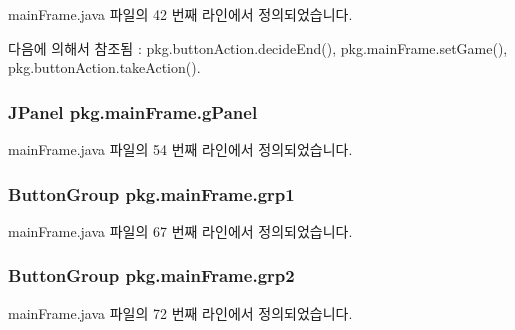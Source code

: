 main\+Frame.\+java 파일의 42 번째 라인에서 정의되었습니다.



다음에 의해서 참조됨 \+:  pkg.\+button\+Action.\+decide\+End(), pkg.\+main\+Frame.\+set\+Game(), pkg.\+button\+Action.\+take\+Action().

\subsubsection[{\texorpdfstring{g\+Panel}{gPanel}}]{\setlength{\rightskip}{0pt plus 5cm}J\+Panel pkg.\+main\+Frame.\+g\+Panel\hspace{0.3cm}{\ttfamily [private]}}\hypertarget{classpkg_1_1main_frame_a17ea45ba089445a24b9da9bf561f6603}{}\label{classpkg_1_1main_frame_a17ea45ba089445a24b9da9bf561f6603}


main\+Frame.\+java 파일의 54 번째 라인에서 정의되었습니다.

\subsubsection[{\texorpdfstring{grp1}{grp1}}]{\setlength{\rightskip}{0pt plus 5cm}Button\+Group pkg.\+main\+Frame.\+grp1\hspace{0.3cm}{\ttfamily [private]}}\hypertarget{classpkg_1_1main_frame_a5411fefa1bd3ef463e0823c2e0f7d528}{}\label{classpkg_1_1main_frame_a5411fefa1bd3ef463e0823c2e0f7d528}


main\+Frame.\+java 파일의 67 번째 라인에서 정의되었습니다.

\subsubsection[{\texorpdfstring{grp2}{grp2}}]{\setlength{\rightskip}{0pt plus 5cm}Button\+Group pkg.\+main\+Frame.\+grp2\hspace{0.3cm}{\ttfamily [private]}}\hypertarget{classpkg_1_1main_frame_a7a69bed6d7c9ba24be87409ecf1295a4}{}\label{classpkg_1_1main_frame_a7a69bed6d7c9ba24be87409ecf1295a4}


main\+Frame.\+java 파일의 72 번째 라인에서 정의되었습니다.

